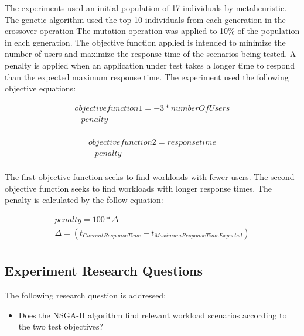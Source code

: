 \documentclass{report}
\begin{document}
The experiments used an initial population of 17 individuals by metaheuristic. The genetic algorithm used the top 10 individuals from each generation in the crossover operation  The mutation operation was applied to 10\% of the population in each generation. The objective function applied is intended to minimize the number of users and maximize the response time of the scenarios being tested. A penalty is applied when an application under test takes a longer time to respond than the expected maximum response time. The experiment used the following objective equations:

\begin{equation}
\begin{aligned}
objective function 1 =-3*numberOfUsers\\
-penalty\\
\end{aligned}
\end{equation}


\begin{equation}
\begin{aligned}
objective function 2 =responsetime\\
-penalty\\
\end{aligned}
\end{equation}

The first objective function seeks to find workloads with fewer users. The second objective function seeks to find workloads with  longer response times. The penalty is calculated by the follow equation:

\begin{equation}
\begin{aligned}
penalty=100 * \Delta \\
\Delta=(t_{Current Response Time} - t_{Maximum Response Time Expected})\\
\end{aligned}
\end{equation}



\subsection{Experiment Research Questions}

The following research question is addressed:
\begin{itemize}
\item Does the NSGA-II algorithm find relevant workload scenarios according to the two test objectives?
\end{itemize}
\end{document}
